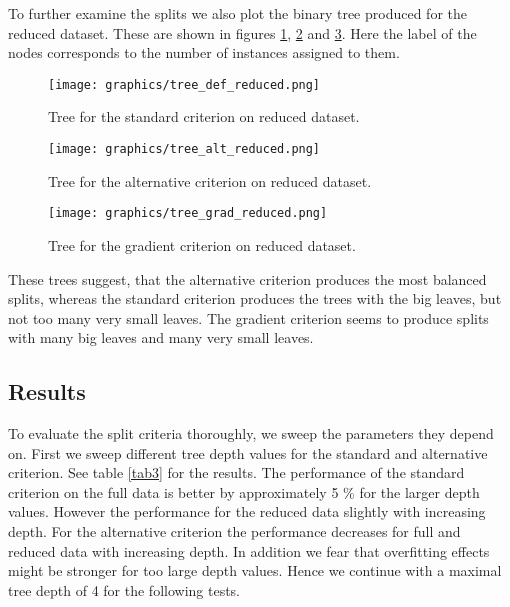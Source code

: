\documentclass[draft]{article}
\begin{document}
\FloatBarrier

To further examine the splits we also plot the binary tree produced for the reduced dataset.
These are shown in figures \ref{fig2d}, \ref{fig2e} and \ref{fig2f}. 
Here the label of the nodes corresponds to the number of instances assigned to them.

\begin{figure}[h]
	\centering
	\texttt{[image: graphics/tree\_def\_reduced.png]}
	\caption{Tree for the standard criterion on reduced dataset.}
	\label{fig2d}
\end{figure}

\begin{figure}[h]
	\centering
	\texttt{[image: graphics/tree\_alt\_reduced.png]}
	\caption{Tree for the alternative criterion on reduced dataset.}
	\label{fig2e}
\end{figure}

\begin{figure}[h]
	\centering
	\texttt{[image: graphics/tree\_grad\_reduced.png]}
	\caption{Tree for the gradient criterion on reduced dataset.}
	\label{fig2f}
\end{figure}

These trees suggest, that the alternative criterion produces the most balanced splits, whereas the 
standard criterion produces the trees with the big leaves, but not too many very small leaves.
The gradient criterion seems to produce splits with many big leaves and many very small leaves.

\FloatBarrier

\subsection{Results}

To evaluate the split criteria thoroughly, we sweep the parameters they depend on.
\newline
First we sweep different tree depth values for the standard and alternative criterion.
See table \ref{tab3} for the results. The performance of the standard criterion on the full data 
is better by approximately 5 \% for the larger depth values.
However the performance for the reduced data slightly with increasing depth.
For the alternative criterion the performance decreases for full and reduced data with increasing depth.
In addition we fear that overfitting effects might be stronger for too large depth values.
Hence we continue with a maximal tree depth of 4 for the following tests.
\end{document}
